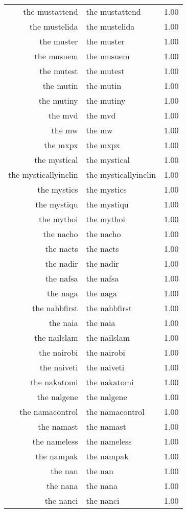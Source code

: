 \begin{table}[ht]
\begin{tabular}{rlr}
  the mustattend & the mustattend & 1.00 \\ 
  the mustelida & the mustelida & 1.00 \\ 
  the muster & the muster & 1.00 \\ 
  the musuem & the musuem & 1.00 \\ 
  the mutest & the mutest & 1.00 \\ 
  the mutin & the mutin & 1.00 \\ 
  the mutiny & the mutiny & 1.00 \\ 
  the mvd & the mvd & 1.00 \\ 
  the mw & the mw & 1.00 \\ 
  the mxpx & the mxpx & 1.00 \\ 
  the mystical & the mystical & 1.00 \\ 
  the mysticallyinclin & the mysticallyinclin & 1.00 \\ 
  the mystics & the mystics & 1.00 \\ 
  the mystiqu & the mystiqu & 1.00 \\ 
  the mythoi & the mythoi & 1.00 \\ 
  the nacho & the nacho & 1.00 \\ 
  the nacts & the nacts & 1.00 \\ 
  the nadir & the nadir & 1.00 \\ 
  the nafsa & the nafsa & 1.00 \\ 
  the naga & the naga & 1.00 \\ 
  the nahbfirst & the nahbfirst & 1.00 \\ 
  the naia & the naia & 1.00 \\ 
  the nailslam & the nailslam & 1.00 \\ 
  the nairobi & the nairobi & 1.00 \\ 
  the naiveti & the naiveti & 1.00 \\ 
  the nakatomi & the nakatomi & 1.00 \\ 
  the nalgene & the nalgene & 1.00 \\ 
  the namacontrol & the namacontrol & 1.00 \\ 
  the namast & the namast & 1.00 \\ 
  the nameless & the nameless & 1.00 \\ 
  the nampak & the nampak & 1.00 \\ 
  the nan & the nan & 1.00 \\ 
  the nana & the nana & 1.00 \\ 
  the nanci & the nanci & 1.00 \\ 

\end{tabular}
\end{table}

